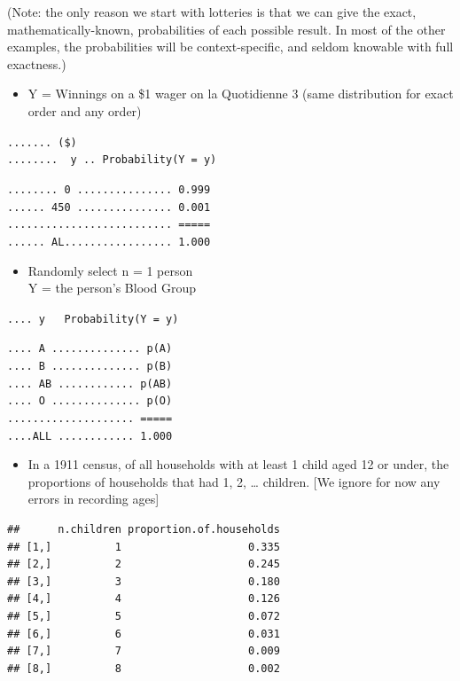 \documentclass[]{book}
\providecommand{\tightlist}{%
  \setlength{\itemsep}{0pt}\setlength{\parskip}{0pt}}
\begin{document}
(Note: the only reason we start with lotteries is that we can give the exact, mathematically-known, probabilities of each possible result. In most of the other examples, the probabilities will be context-specific, and seldom knowable with full exactness.)

\begin{itemize}
\tightlist
\item
  Y = Winnings on a \$1 wager on la Quotidienne 3
  (same distribution for exact order and any order)
\end{itemize}

\texttt{.......\ (\$)}\\
\texttt{........\ \ y\ ..\ Probability(Y\ =\ y)}

\texttt{........\ 0\ ...............\ 0.999}~\\
\texttt{......\ 450\ ...............\ 0.001}~\\
\texttt{..........................\ =====}~\\
\texttt{......\ AL.................\ 1.000}

\begin{itemize}
\tightlist
\item
  Randomly select n = 1 person\\
  Y = the person's Blood Group
\end{itemize}

\texttt{....\ y\ \ \ Probability(Y\ =\ y)}

\texttt{....\ A\ ..............\ p(A)}\\
\texttt{....\ B\ ..............\ p(B)}~\\
\texttt{....\ AB\ ............\ p(AB)}~\\
\texttt{....\ O\ ..............\ p(O)}~\\
\texttt{....................\ =====}~\\
\texttt{....ALL\ ............\ 1.000}

\begin{itemize}
\tightlist
\item
  In a 1911 census, of all households with at least 1 child aged 12 or under, the proportions of households that had 1, 2, \ldots{} children. {[}We ignore for now any errors in recording ages{]}
\end{itemize}

\begin{verbatim}
##      n.children proportion.of.households
## [1,]          1                    0.335
## [2,]          2                    0.245
## [3,]          3                    0.180
## [4,]          4                    0.126
## [5,]          5                    0.072
## [6,]          6                    0.031
## [7,]          7                    0.009
## [8,]          8                    0.002
\end{verbatim}
\end{document}
